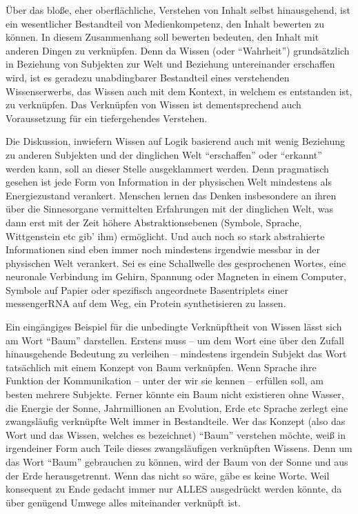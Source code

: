 Über das bloße, eher oberflächliche, Verstehen von Inhalt selbst hinausgehend, ist ein wesentlicher Bestandteil von Medienkompetenz, den Inhalt bewerten zu können. In diesem Zusammenhang soll bewerten bedeuten, den Inhalt mit anderen Dingen zu verknüpfen. Denn da Wissen (oder \enquote{Wahrheit}) grundsätzlich in Beziehung von Subjekten zur Welt und Beziehung untereinander erschaffen wird, ist es geradezu unabdingbarer Bestandteil eines verstehenden Wissenserwerbs, das Wissen auch mit dem Kontext, in welchem es entstanden ist, zu verknüpfen. Das Verknüpfen von Wissen ist dementsprechend auch Voraussetzung für ein tiefergehendes Verstehen. 

Die Diskussion, inwiefern Wissen auf Logik basierend auch mit wenig Beziehung zu anderen Subjekten und der dinglichen Welt \enquote{erschaffen} oder \enquote{erkannt} werden kann, soll an dieser Stelle ausgeklammert werden. Denn pragmatisch gesehen ist jede Form von Information in der physischen Welt mindestens als Energiezustand verankert. Menschen lernen das Denken insbesondere an ihren über die Sinnesorgane vermittelten Erfahrungen mit der dinglichen Welt, was dann erst mit der Zeit höhere Abstraktionsebenen (Symbole, Sprache, Wittgenstein \gls{etc} gib' ihm) ermöglicht. Und auch noch so stark abstrahierte Informationen sind eben immer noch mindestens irgendwie messbar in der physischen Welt verankert. Sei es eine Schallwelle des gesprochenen Wortes, eine neuronale Verbindung im Gehirn, Spannung oder Magneten in einem Computer, Symbole auf Papier oder spezifisch angeordnete Basentriplets einer messengerRNA auf dem Weg, ein Protein synthetisieren zu lassen. 

Ein eingängiges Beispiel für die unbedingte Verknüpftheit von Wissen lässt sich am Wort \enquote{Baum} darstellen. Erstens muss -- um dem Wort eine über den Zufall hinausgehende Bedeutung zu verleihen -- mindestens irgendein Subjekt das Wort tatsächlich mit einem Konzept von Baum verknüpfen. Wenn Sprache ihre Funktion der Kommunikation -- unter der wir sie kennen -- erfüllen soll, am besten mehrere Subjekte.
Ferner könnte ein Baum nicht existieren ohne Wasser, die Energie der Sonne, Jahrmillionen an Evolution, Erde \gls{etc} Sprache zerlegt eine zwangsläufig verknüpfte Welt immer in Bestandteile. 
Wer das Konzept (also das Wort und das Wissen, welches es bezeichnet) \enquote{Baum} verstehen möchte, weiß in irgendeiner Form auch Teile dieses zwangsläufigen verknüpften Wissens. Denn um das Wort \enquote{Baum} gebrauchen zu können, wird der Baum von der Sonne und aus der Erde herausgetrennt. Wenn das nicht so wäre, gäbe es keine Worte. Weil konsequent zu Ende gedacht immer nur ALLES ausgedrückt werden könnte, da über genügend Umwege alles miteinander verknüpft ist. 

